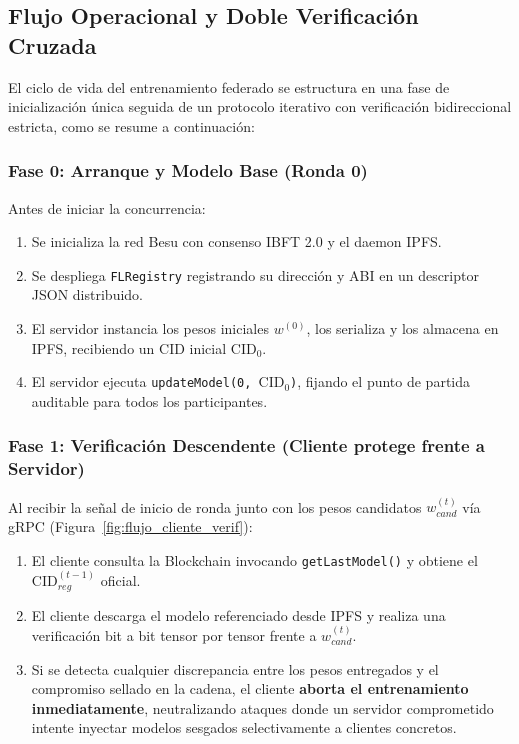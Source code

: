 \subsection{Flujo Operacional y Doble Verificación Cruzada}
El ciclo de vida del entrenamiento federado se estructura en una fase de inicialización única seguida de un protocolo iterativo con verificación bidireccional estricta, como se resume a continuación:
\\

\subsubsection{Fase 0: Arranque y Modelo Base (Ronda 0)}
Antes de iniciar la concurrencia:
\begin{enumerate}
    \item Se inicializa la red Besu con consenso IBFT 2.0 y el daemon IPFS.
    \item Se despliega \texttt{FLRegistry} registrando su dirección y ABI en un descriptor JSON distribuido.
    \item El servidor instancia los pesos iniciales $w^{(0)}$, los serializa y los almacena en IPFS, recibiendo un CID inicial $\text{CID}_0$.
    \item El servidor ejecuta \texttt{updateModel(0, }$\text{CID}_0$\texttt{)}, fijando el punto de partida auditable para todos los participantes. \\
\end{enumerate}

\subsubsection{Fase 1: Verificación Descendente (Cliente protege frente a Servidor)}
Al recibir la señal de inicio de ronda junto con los pesos candidatos $w_{cand}^{(t)}$ vía gRPC (Figura~\ref{fig:flujo_cliente_verif}):
\begin{enumerate}
    \item El cliente consulta la Blockchain invocando \texttt{getLastModel()} y obtiene el $\text{CID}_{reg}^{(t-1)}$ oficial.
    \item El cliente descarga el modelo referenciado desde IPFS y realiza una verificación bit a bit tensor por tensor frente a $w_{cand}^{(t)}$.
    \item Si se detecta cualquier discrepancia entre los pesos entregados y el compromiso sellado en la cadena, el cliente \textbf{aborta el entrenamiento inmediatamente}, neutralizando ataques donde un servidor comprometido intente inyectar modelos sesgados selectivamente a clientes concretos.
\end{enumerate}

